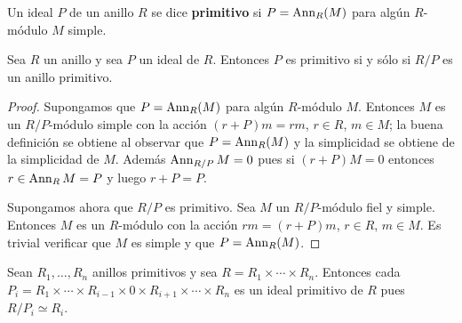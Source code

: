 \begin{definition}
	Un ideal $P$ de un anillo $R$ se dice \textbf{primitivo} si $P=\operatorname{Ann}_R(M)$
	para algún $R$-módulo $M$ simple.
\end{definition}

\begin{lemma}
	\label{lemma:primitivo}
	Sea $R$ un anillo y sea $P$ un ideal de $R$. Entonces $P$ es primitivo si y
	sólo si $R/P$ es un anillo primitivo.
\end{lemma}

\begin{proof}
	Supongamos que $P=\operatorname{Ann}_R(M)$ para algún $R$-módulo $M$. Entonces $M$ es un
	$R/P$-módulo simple con la acción $(r+P)m=rm$, $r\in R$, $m\in M$; la buena
	definición se obtiene al observar que $P=\operatorname{Ann}_R(M)$ y la simplicidad se
	obtiene de la simplicidad de $M$. Además $\operatorname{Ann}_{R/P}M=0$ pues  si
	$(r+P)M=0$ entonces $r\in\operatorname{Ann}_RM=P$ y luego $r+P=P$.

	Supongamos ahora que $R/P$ es primitivo. Sea $M$ un $R/P$-módulo fiel y
	simple.  Entonces $M$ es un $R$-módulo con la acción $rm=(r+P)m$, $r\in R$,
	$m\in M$. Es trivial verificar que $M$ es simple y que $P=\operatorname{Ann}_R(M)$. 
\end{proof}



\begin{example}
	Sean $R_1,\dots,R_n$ anillos primitivos y sea $R=R_1\times\cdots\times
	R_n$. Entonces cada $P_i=R_1\times\cdots\times R_{i-1}\times 0\times
	R_{i+1}\times\cdots\times R_n$ es un ideal primitivo de $R$ pues
	$R/P_i\simeq R_i$.
\end{example}

%

